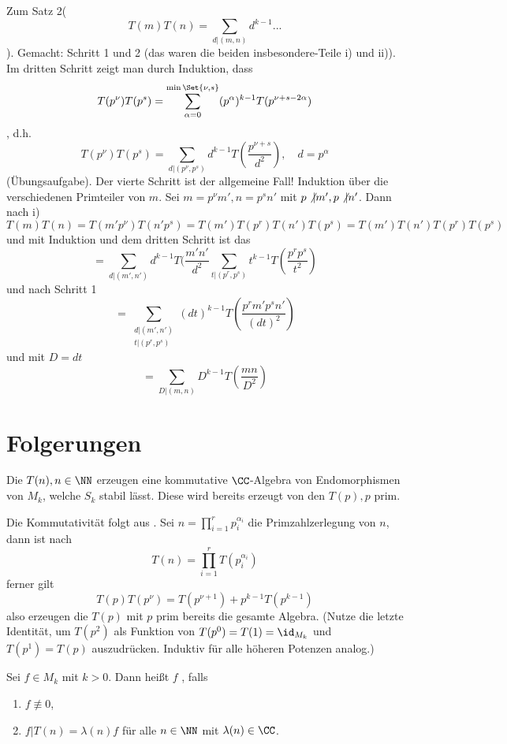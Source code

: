Zum Satz 2(
\[
T(m)T(n) = \sum_{d \vert (m,n)} d^{k-1} ...
\]
). Gemacht: Schritt 1 und 2 (das waren die beiden insbesondere-Teile i) und ii)). Im dritten Schritt zeigt man durch Induktion, dass 
\[
T(p^\nu) T(p^s) = \sum_{\alpha = 0}^{\min \Set {\nu, s}} (p^\alpha)^{k-1} T(p^{\nu + s - 2\alpha})
\], d.h.
\[
T(p^\nu) T(p^s) = \sum_{d \vert (p^\nu, p^s)} d^{k-1} T(\frac{p^{\nu + s}}{d^2}), \quad d = p^\alpha
\] (Übungsaufgabe).
Der vierte Schritt ist der allgemeine Fall! Induktion über die verschiedenen Primteiler von $m$. Sei $m = p^\nu m', n = p^s n'$ mit $p \not \vert m', p \not \vert n'$. Dann nach i)
\[
T(m)T(n) = T(m'p^\nu) T(n'p^s) = T(m')T(p^r)T(n')T(p^s) = T(m') T(n') T(p^r) T(p^s)
\]
und mit Induktion und dem dritten Schritt ist das
\[
= \sum_{d \vert (m',n')} d^{k-1} T(\frac {m'n'}{d^2} \sum_{t \vert (p^r, p^s)} t^{k-1} T(\frac{p^rp^s}{t^2}) 
\]
und nach Schritt 1
\[
= \sum_{\substack{d \vert (m',n')\\t \vert (p^r, p^s)}} (dt)^{k-1} T(\frac {p^rm'p^sn'}{(dt)^2})
\]
und mit $D = dt$
\[
= \sum_{D \vert (m,n)} D^{k-1} T(\frac {mn}{D^2})
\]

\section{Folgerungen}

\begin{satz}
Die $T(n), n \in \NN$ erzeugen eine kommutative $\CC$-Algebra von Endomorphismen von $M_k$, welche $S_k$ stabil lässt. Diese wird bereits erzeugt von den $T(p), p$ prim.
\end{satz}

\begin{bewe}
Die Kommutativität folgt aus . Sei $n = \prod_{i=1}^{r} p_i^{\alpha_i}$ die Primzahlzerlegung von $n$, dann ist nach 
\[
T(n) = \prod_{i=1}^{r} T(p_i^{\alpha_i})
\]
ferner gilt
\[
T(p) T(p^\nu) = T(p^{\nu+1}) + p^{k-1} T(p^{k-1})
\]
also erzeugen die $T(p)$ mit $p$ prim bereits die gesamte Algebra. (Nutze die letzte Identität, um $T(p^{2})$ als Funktion von $T(p^0) = T(1) = \id_{M_k}$ und $T(p^1) = T(p)$ auszudrücken. Induktiv für alle höheren Potenzen analog.)
\end{bewe}

\begin{defi}
Sei $f \in M_k$ mit $k > 0$. Dann heißt $f$ , falls
\begin{enumerate}
\item $f \not \equiv 0$,
\item $f | T(n) = \lambda (n) f$ für alle $n \in \NN$ mit $\lambda (n) \in \CC$.
\end{enumerate}
\end{defi}


